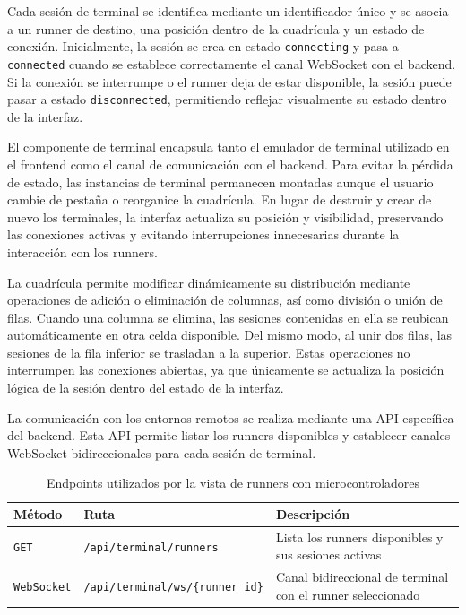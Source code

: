 Cada sesión de terminal se identifica mediante un identificador único y se asocia a un runner de destino, una posición dentro de la cuadrícula y un estado de conexión. Inicialmente, la sesión se crea en estado \texttt{connecting} y pasa a \texttt{connected} cuando se establece correctamente el canal WebSocket con el backend. Si la conexión se interrumpe o el runner deja de estar disponible, la sesión puede pasar a estado \texttt{disconnected}, permitiendo reflejar visualmente su estado dentro de la interfaz.

El componente de terminal encapsula tanto el emulador de terminal utilizado en el frontend como el canal de comunicación con el backend. Para evitar la pérdida de estado, las instancias de terminal permanecen montadas aunque el usuario cambie de pestaña o reorganice la cuadrícula. En lugar de destruir y crear de nuevo los terminales, la interfaz actualiza su posición y visibilidad, preservando las conexiones activas y evitando interrupciones innecesarias durante la interacción con los runners.

La cuadrícula permite modificar dinámicamente su distribución mediante operaciones de adición o eliminación de columnas, así como división o unión de filas. Cuando una columna se elimina, las sesiones contenidas en ella se reubican automáticamente en otra celda disponible. Del mismo modo, al unir dos filas, las sesiones de la fila inferior se trasladan a la superior. Estas operaciones no interrumpen las conexiones abiertas, ya que únicamente se actualiza la posición lógica de la sesión dentro del estado de la interfaz.

La comunicación con los entornos remotos se realiza mediante una API específica del backend. Esta API permite listar los runners disponibles y establecer canales WebSocket bidireccionales para cada sesión de terminal.

\begin{table}[H]
\centering
\renewcommand{\arraystretch}{1.3}
\begin{tabular}{|l|l|p{7cm}|}
\hline
\textbf{Método} & \textbf{Ruta} & \textbf{Descripción} \\ \hline
\texttt{GET} & \texttt{/api/terminal/runners} & Lista los runners disponibles y sus sesiones activas \\ \hline
\texttt{WebSocket} & \texttt{/api/terminal/ws/\{runner\_id\}} & Canal bidireccional de terminal con el runner seleccionado \\ \hline
\end{tabular}
\caption{Endpoints utilizados por la vista de runners con microcontroladores}
\label{tab:api-runners-microcontroladores}
\end{table}

